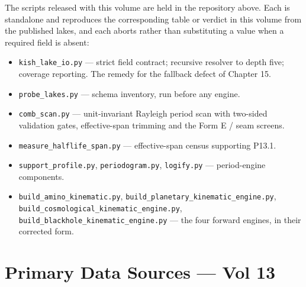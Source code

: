 \documentclass[11pt, letterpaper, openany]{book}
\begin{document}
\noindent The scripts released with this volume are held in the repository above. Each is
standalone and reproduces the corresponding table or verdict in this volume from the published
lakes, and each aborts rather than substituting a value when a required field is absent:

\begin{itemize}
    \item \texttt{kish\_lake\_io.py} --- strict field contract; recursive resolver to depth
          five; coverage reporting. The remedy for the fallback defect of Chapter 15.
    \item \texttt{probe\_lakes.py} --- schema inventory, run before any engine.
    \item \texttt{comb\_scan.py} --- unit-invariant Rayleigh period scan with two-sided
          validation gates, effective-span trimming and the Form E / seam screens.
    \item \texttt{measure\_halflife\_span.py} --- effective-span census supporting P13.1.
    \item \texttt{support\_profile.py}, \texttt{periodogram.py}, \texttt{logify.py} ---
          period-engine components.
    \item \texttt{build\_amino\_kinematic.py}, \texttt{build\_planetary\_kinematic\_engine.py},
          \texttt{build\_cosmological\_kinematic\_engine.py},
          \texttt{build\_blackhole\_kinematic\_engine.py} --- the four forward engines, in
          their corrected form.
\end{itemize}

\section*{Primary Data Sources --- Vol 13}
\end{document}
